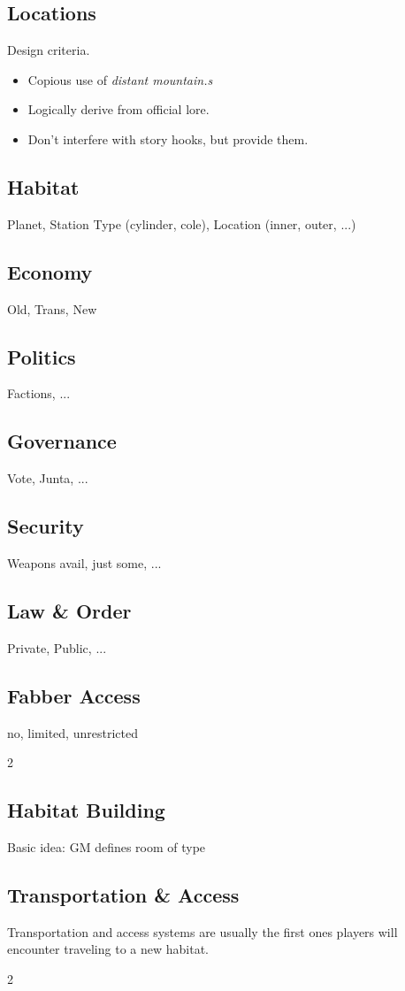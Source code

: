 \documentclass[a4]{book}
\begin{document}
\begin{multicols}{2}

\section*{Locations}

Design criteria.

\begin{itemize}
    \item Copious use of \textit{distant mountain.s}
    \item Logically derive from official \eclipsephase lore.
    \item Don't interfere with story hooks, but provide them.
\end{itemize}

\subsection*{Habitat} Planet, Station Type (cylinder, cole), Location (inner, outer, ...)
\subsection*{Economy} Old, Trans, New
\subsection*{Politics} Factions, ...
\subsection*{Governance} Vote, Junta, ...
\subsection*{Security} Weapons avail, just some, ...
\subsection*{Law \& Order} Private, Public, ...
\subsection*{Fabber Access} no, limited, unrestricted


\end{multicols}{2}



\begin{multicols}{2}

\section*{Habitat Building}

Basic idea: GM defines room of type

\subsection*{Transportation \& Access}

Transportation and access systems are usually the first ones players will encounter
traveling to a new habitat.
\end{multicols}{2}
\end{document}
